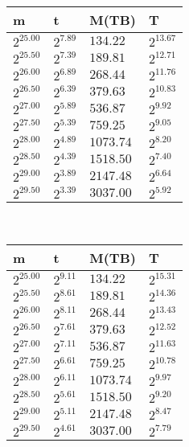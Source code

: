 \begin{tabular}{llll}
m & t & M(TB) & T \\ \hline
$2^{25.00}$ & $2^{7.89}$ & $134.22$ & $2^{13.67}$ \\
$2^{25.50}$ & $2^{7.39}$ & $189.81$ & $2^{12.71}$ \\
$2^{26.00}$ & $2^{6.89}$ & $268.44$ & $2^{11.76}$ \\
$2^{26.50}$ & $2^{6.39}$ & $379.63$ & $2^{10.83}$ \\
$2^{27.00}$ & $2^{5.89}$ & $536.87$ & $2^{9.92}$ \\
$2^{27.50}$ & $2^{5.39}$ & $759.25$ & $2^{9.05}$ \\
$2^{28.00}$ & $2^{4.89}$ & $1073.74$ & $2^{8.20}$ \\
$2^{28.50}$ & $2^{4.39}$ & $1518.50$ & $2^{7.40}$ \\
$2^{29.00}$ & $2^{3.89}$ & $2147.48$ & $2^{6.64}$ \\
$2^{29.50}$ & $2^{3.39}$ & $3037.00$ & $2^{5.92}$ \\
\end{tabular}
 \ 
\begin{tabular}{llll}
m & t & M(TB) & T \\ \hline
$2^{25.00}$ & $2^{9.11}$ & $134.22$ & $2^{15.31}$ \\
$2^{25.50}$ & $2^{8.61}$ & $189.81$ & $2^{14.36}$ \\
$2^{26.00}$ & $2^{8.11}$ & $268.44$ & $2^{13.43}$ \\
$2^{26.50}$ & $2^{7.61}$ & $379.63$ & $2^{12.52}$ \\
$2^{27.00}$ & $2^{7.11}$ & $536.87$ & $2^{11.63}$ \\
$2^{27.50}$ & $2^{6.61}$ & $759.25$ & $2^{10.78}$ \\
$2^{28.00}$ & $2^{6.11}$ & $1073.74$ & $2^{9.97}$ \\
$2^{28.50}$ & $2^{5.61}$ & $1518.50$ & $2^{9.20}$ \\
$2^{29.00}$ & $2^{5.11}$ & $2147.48$ & $2^{8.47}$ \\
$2^{29.50}$ & $2^{4.61}$ & $3037.00$ & $2^{7.79}$ \\
\end{tabular}
 \ 
